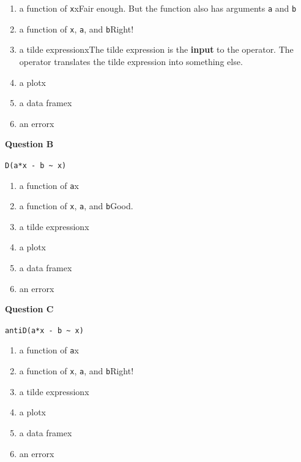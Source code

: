 \documentclass[
  letterpaper,
  DIV=11,
  numbers=noendperiod,
  oneside]{article}
\providecommand{\tightlist}{%
  \setlength{\itemsep}{0pt}\setlength{\parskip}{0pt}}\usepackage{longtable,booktabs,array}
\begin{document}
\begin{multicols}{2}
\begin{enumerate}
\def\labelenumi{\roman{enumi}.}
\tightlist
\item
  {a function of \texttt{x}{xFair enough. But the function also has
  arguments \texttt{a} and \texttt{b} }}\\
\item
  {a function of \texttt{x}, \texttt{a}, and \texttt{b}{Right!~}}\\
\item
  {a tilde expression{xThe tilde expression is the \textbf{input} to
  the operator. The operator translates the tilde expression into
  something else.}}\\
\item
  {a plot{x}}\\
\item
  {a data frame{x}}\\
\item
  {an error{x}}
\end{enumerate}

\textbf{Question B}

\texttt{D(a*x\ -\ b\ \textasciitilde{}\ x)}

\begin{enumerate}
\def\labelenumi{\roman{enumi}.}
\tightlist
\item
  {a function of \texttt{a}{x}}\\
\item
  {a function of \texttt{x}, \texttt{a}, and \texttt{b}{Good.~}}\\
\item
  {a tilde expression{x}}\\
\item
  {a plot{x}}\\
\item
  {a data frame{x}}\\
\item
  {an error{x}}
\end{enumerate}

\textbf{Question C}

\texttt{antiD(a*x\ -\ b\ \textasciitilde{}\ x)}

\begin{enumerate}
\def\labelenumi{\roman{enumi}.}
\tightlist
\item
  {a function of \texttt{a}{x}}\\
\item
  {a function of \texttt{x}, \texttt{a}, and \texttt{b}{Right!~}}\\
\item
  {a tilde expression{x}}\\
\item
  {a plot{x}}\\
\item
  {a data frame{x}}\\
\item
  {an error{x}}
\end{enumerate}


\end{multicols}
\end{document}
